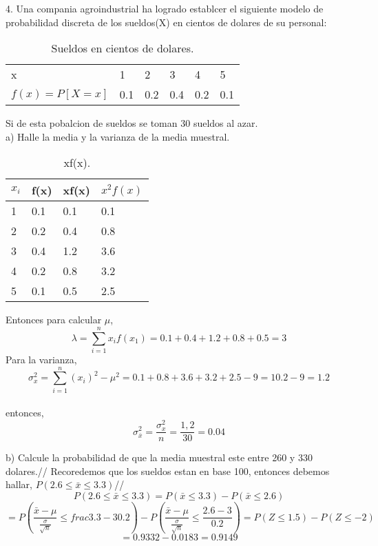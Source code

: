 \documentclass{article}
\begin{document}
4. Una compania agroindustrial ha logrado establcer el siguiente modelo de probabilidad discreta de los sueldos(X) en cientos de dolares de su personal:

\begin{table}[htb]
\centering
\begin{tabular}{|l|l|l|l|l|l|}
\hline
         x & 1 &2 & 3& 4& 5  \\ \cline{1-6}
$f(x)=P[X=x]$& 0.1 &0.2 & 0.4&0.2&0.1\\ \cline{1-6}

\end{tabular}
\caption{Sueldos en cientos de dolares.}
\label{tabla:final}
\end{table}
Si de esta pobalcion de sueldos se toman 30 sueldos al azar.\\
a) Halle la media y la varianza de la media muestral.
\begin{table}[htb]
\centering
\begin{tabular}{| p{2.2cm}| p{2.2cm} | p{2.2cm} | p{2.2cm} |}
\hline
$x_{i}$ & f(x)& xf(x)& $x^2f(x)$\\ \hline
1 & 0.1 & 0.1&  0.1\\ \hline
2 & 0.2 & 0.4 & 0.8\\ \hline
3 & 0.4 & 1.2 & 3.6\\ \hline
4 & 0.2 & 0.8& 3.2\\ \hline
5 & 0.1 & 0.5& 2.5\\ \hline
\end{tabular}
\caption{xf(x).}
\end{table}

Entonces para calcular $\mu$, $$\lambda=\displaystyle\sum_{i=1}^nx_{i}f(x_{1})=0.1+0.4+1.2+0.8+0.5=3$$
Para la varianza, $$\sigma^2_{x}=\displaystyle\sum_{i=1}^n(x_{i})^2-\mu^2=0.1+0.8+3.6+3.2+2.5-9= 10.2-9=1.2$$\\
entonces,  $$\sigma^2_{\bar{x}}=\frac{\sigma^2_{x}}{n}=\frac{1,2}{30}=0.04$$

b) Calcule la probabilidad de que la media muestral este entre 260 y 330 dolares.//
Recoredemos que los sueldos estan en base 100, entonces debemos hallar, $P(2.6\leq  \bar{x}\leq  3.3)$//
$$P(2.6\leq  \bar{x}\leq  3.3)=P( \bar{x}\leq  3.3 )-P(\bar{x}\leq2.6  )$$
$$=P( \frac{\bar{x}-\mu}{\frac{\sigma}{\sqrt{n}}}\leq  frac{3.3-3}{0.2} )-P( \frac{\bar{x}-\mu}{\frac{\sigma}{\sqrt{n}}}\leq\frac{2.6-3}{0.2} )=P(Z\leq 1.5)-P(Z\leq -2)$$
$$=0.9332-0.0183 =0.9149$$
\end{document}
